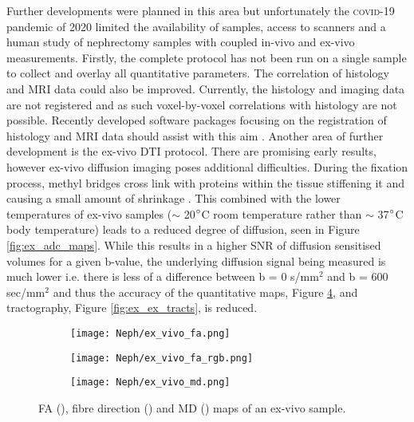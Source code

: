Further developments were planned in this area but unfortunately the \textsc{covid}-19 pandemic of 2020 limited the availability of samples, access to scanners and a human study of nephrectomy samples with coupled in-vivo and ex-vivo measurements. Firstly, the complete protocol has not been run on a single sample to collect and overlay all quantitative parameters. The correlation of histology and \ac{MRI} data could also be improved. Currently, the histology and imaging data are not registered and as such voxel-by-voxel correlations with histology are not possible. Recently developed software packages focusing on the registration of histology and \ac{MRI} data should assist with this aim \cite{huszar_tensor_2019}. Another area of further development is the ex-vivo \ac{DTI} protocol. There are promising early results, however ex-vivo diffusion imaging poses additional difficulties. During the fixation process, methyl bridges cross link with proteins within the tissue stiffening it and causing a small amount of shrinkage \cite{thavarajah_chemical_2012}. This combined with the lower temperatures of ex-vivo samples ($\sim$ 20$\degree$C room temperature rather than $\sim$ 37$\degree$C body temperature) leads to a reduced degree of diffusion, seen in Figure \ref{fig:ex_adc_maps}. While this results in a higher \ac{SNR} of diffusion sensitised volumes for a given b-value, the underlying diffusion signal being measured is much lower i.e. there is less of a difference between b = 0 s/mm$^2$ and b = 600 sec/mm$^2$ and thus the accuracy of the quantitative maps, Figure \ref{fig:ex_ex_dti_maps}, and tractography, Figure \ref{fig:ex_ex_tracts}, is reduced.

\begin{figure}[H]
	\centering
	\begin{subfigure}[c]{0.31\textwidth}
		\centering
		\texttt{[image: Neph/ex\_vivo\_fa.png]} %
		\caption{}
		\label{fig:ex_ex_dti_fa}
	\end{subfigure}
	\hfill
	\begin{subfigure}[c]{0.31\textwidth}
		\centering
		\texttt{[image: Neph/ex\_vivo\_fa\_rgb.png]} %
		\caption{}
		\label{fig:ex_ex_dti_fa_rgb}
	\end{subfigure}
	\hfill	
	\begin{subfigure}[c]{0.31\textwidth}
		\centering
		\texttt{[image: Neph/ex\_vivo\_md.png]} %
		\caption{}
		\label{fig:ex_ex_dti_md}
	\end{subfigure}
	\caption{\ac{FA} (), fibre direction () and \ac{MD} () maps of an ex-vivo sample.}
	\label{fig:ex_ex_dti_maps}
\end{figure}

